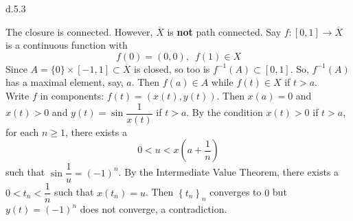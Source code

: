 \begin{customexa}{d.5.3}
\begin{enumerate}
\begin{center}
    \end{center}
    The closure is connected. However, $\overline{X}$ is {\bf not} path connected. Say $f:[0, 1] \longrightarrow \overline{X}$ is a continuous function with 
    $$f(0) = (0, 0), \,\,\,f(1) \in X$$
    Since $A = \{0\} \times [-1, 1] \subset \overline{X}$ is closed, so too is $f^{-1}(A) \subset [0, 1]$. So, $f^{-1}(A)$ has a maximal element, say, $a$. Then $f(a)\in A$ while $f(t) \in X$ if $t > a$.\\
    Write $f$ in components: $f(t) = \left(x(t), y(t)\right)$. Then $x(a) = 0$ and $x(t) > 0$ and $y(t) = \sin{\dfrac{1}{x(t)}}$ if $t > a$. By the condition $x(t) > 0$ if $t > a$, for each $n \geqslant 1$, there exists a 
    $$0 < u < x\left(a + \dfrac{1}{n}\right)$$
    such that $\sin{\dfrac{1}{u}} = (-1)^n$. By the Intermediate Value Theorem, there exists a $0 < t_n < \dfrac{1}{n}$ such that $x(t_n) = u$. Then $\left\{t_n\right\}_n$ converges to $0$ but $y(t) = (-1)^n$ does not converge, a contradiction.
\end{enumerate}
\end{customexa}


